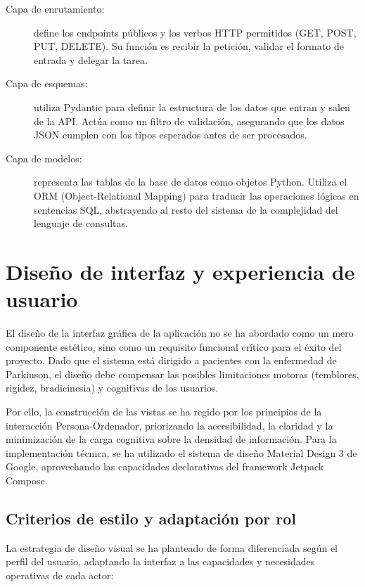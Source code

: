 \begin{description}
    \item[Capa de enrutamiento:] define los endpoints públicos y los verbos HTTP permitidos (GET, POST, PUT, DELETE). Su función es recibir la petición, validar el formato de entrada y delegar la tarea.
    
    \item[Capa de esquemas:] utiliza Pydantic\cite{pydantic_docs} para definir la estructura de los datos que entran y salen de la API. Actúa como un filtro de validación, asegurando que los datos JSON cumplen con los tipos esperados antes de ser procesados.
    
    \item[Capa de modelos:] representa las tablas de la base de datos como objetos Python. Utiliza el ORM (Object-Relational Mapping) para traducir las operaciones lógicas en sentencias SQL, abstrayendo al resto del sistema de la complejidad del lenguaje de consultas.
\end{description}

\section{Diseño de interfaz y experiencia de usuario}
El diseño de la interfaz gráfica de la aplicación no se ha abordado como un mero componente estético, sino como un requisito funcional crítico para el éxito del proyecto. Dado que el sistema está dirigido a pacientes con la enfermedad de Parkinson, el diseño debe compensar las posibles limitaciones motoras (temblores, rigidez, bradicinesia) y cognitivas de los usuarios.

Por ello, la construcción de las vistas se ha regido por los principios de la interacción Persona-Ordenador, priorizando la accesibilidad, la claridad y la minimización de la carga cognitiva sobre la densidad de información. Para la implementación técnica, se ha utilizado el sistema de diseño Material Design 3 de Google, aprovechando las capacidades declarativas del framework Jetpack Compose.

\subsection{Criterios de estilo y adaptación por rol}

La estrategia de diseño visual se ha planteado de forma diferenciada según el perfil del usuario, adaptando la interfaz a las capacidades y necesidades operativas de cada actor:

